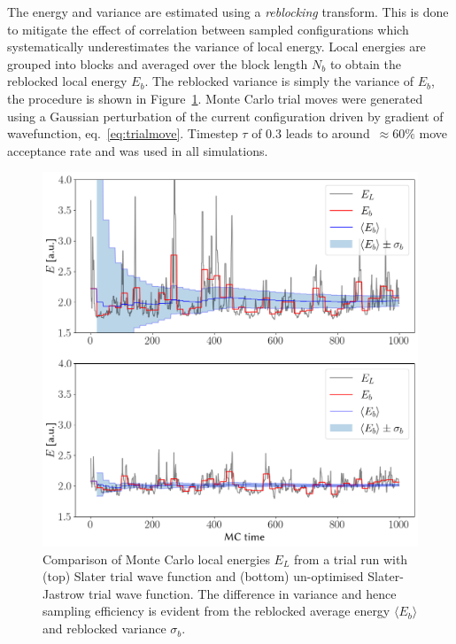 \documentclass[final,3p,times,twocolumn]{elsarticle}
\begin{document}
	The energy and variance are estimated using a \emph{reblocking} transform. This is done to mitigate the effect of correlation between sampled configurations which systematically underestimates the variance of local energy. Local energies are grouped into blocks and averaged over the block length $N_b$ to obtain the reblocked local energy $E_b$. The reblocked variance is simply the variance of $E_b$, the procedure is shown in Figure~\ref{fig:blocking+jast}. 
	Monte Carlo trial moves were generated using a Gaussian perturbation of the current configuration driven by gradient of wavefunction, eq.~\eqref{eq:trialmove}. Timestep $\tau$ of $0.3$ leads to around~$\approx 60\%$ move acceptance rate and was used in all simulations.
	\begin{figure}
	\centering
	\includegraphics[width=\linewidth]{../plots/blocking.png}
	\caption{Comparison of Monte Carlo local energies $E_L$ from a trial run with (top) Slater trial wave function and (bottom) un-optimised Slater-Jastrow trial wave function. The difference in variance and hence sampling efficiency is evident from the reblocked average energy $\langle E_b \rangle$ and reblocked variance $\sigma_b$.}
	\label{fig:blocking+jast}
	\end{figure}
\end{document}
